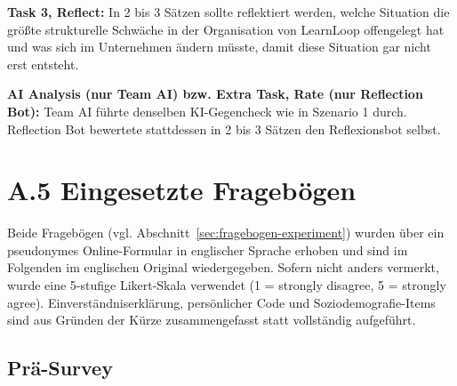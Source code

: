 \textbf{Task 3, Reflect:} In 2 bis 3 Sätzen sollte reflektiert werden, welche Situation die größte
strukturelle Schwäche in der Organisation von LearnLoop offengelegt hat und was sich im Unternehmen
ändern müsste, damit diese Situation gar nicht erst entsteht.

\textbf{AI Analysis (nur Team AI) bzw. Extra Task, Rate (nur Reflection Bot):} Team AI führte
denselben KI-Gegencheck wie in Szenario 1 durch. Reflection Bot bewertete stattdessen in 2 bis 3
Sätzen den Reflexionsbot selbst.

\section*{A.5 Eingesetzte Fragebögen}
\label{app:fragebogen}

Beide Fragebögen (vgl. Abschnitt~\ref{sec:fragebogen-experiment}) wurden über ein pseudonymes
Online-Formular in englischer Sprache erhoben und sind im Folgenden im englischen Original
wiedergegeben. Sofern nicht anders vermerkt, wurde eine 5-stufige Likert-Skala verwendet
(1 = strongly disagree, 5 = strongly agree). Einverständniserklärung, persönlicher Code und
Soziodemografie-Items sind aus Gründen der Kürze zusammengefasst statt vollständig aufgeführt.

\subsection*{Prä-Survey}

